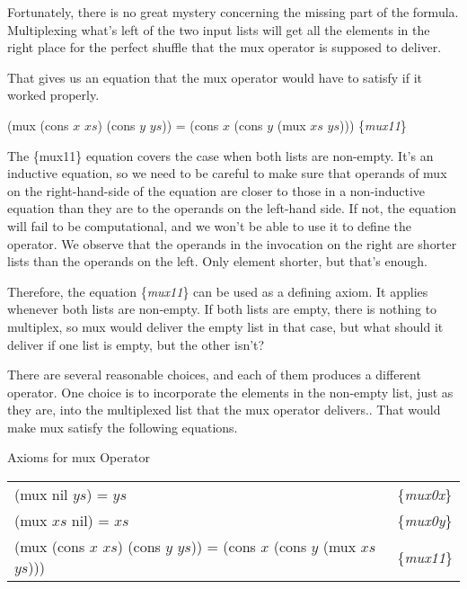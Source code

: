 Fortunately, there is no great mystery concerning the missing part of the formula.
Multiplexing what's left of the two input lists will get all the elements
in the right place for the perfect shuffle that the mux operator is supposed to deliver.

That gives us an equation that the mux operator
would have to satisfy if it worked properly.

\hspace{1cm} (mux (cons $x$ $xs$) (cons $y$ $ys$)) = (cons $x$ (cons $y$ (mux $xs$ $ys$)))
\hfill \{\emph{mux11}\}

The \{mux11\} equation covers the case when both lists are non-empty.
It's an inductive equation, so we need to be careful to make sure
that operands of mux on the right-hand-side of the equation
are closer to those in a non-inductive equation than they are
to the operands on the left-hand side.
If not, the equation will fail to be computational, and
we won't be able to use it to define the operator.
We observe that the operands in the invocation on the
right are shorter lists than the operands on the left.
Only  element shorter, but that's enough.

Therefore, the equation \{\emph{mux11}\} can be used
as a defining axiom. It applies whenever both lists are non-empty.
If both lists are empty, there is nothing to multiplex,
so mux would deliver the empty list in that case, but
what should it deliver if one list is empty, but the other isn't?

There are several reasonable choices, and each of them produces
a different operator. One choice is to incorporate the elements
in the non-empty list, just as they are, into the
multiplexed list that the mux operator delivers..
That would make mux satisfy the following equations.

\begin{center}
Axioms for mux Operator
\begin{tabular}{ll}
(mux nil $ys$) = $ys$  & \{\emph{mux0x}\}     \\
(mux $xs$ nil) = $xs$  & \{\emph{mux0y}\}     \\
(mux (cons $x$ $xs$) (cons $y$ $ys$)) = (cons $x$ (cons $y$ (mux $xs$ $ys$))) & \{\emph{mux11}\} \\
\end{tabular}
\end{center}

